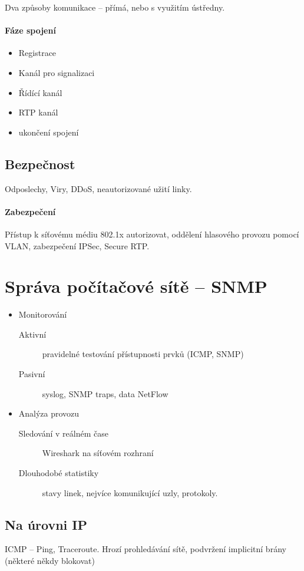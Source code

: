 \documentclass[a4wide]{report}
\begin{document}
Dva způsoby komunikace -- přímá, nebo s využitím ústředny.

\paragraph{Fáze spojení}
\begin{itemize}
	\item Registrace
	\item Kanál pro signalizaci
	\item Řídící kanál
	\item RTP kanál
	\item ukončení spojení
\end{itemize}

\subsection{Bezpečnost}

Odposlechy, Viry, DDoS, neautorizované užití linky.

\paragraph{Zabezpečení}
Přístup k síťovému médiu 802.1x autorizovat, oddělení hlasového provozu pomocí VLAN, zabezpečení IPSec, Secure RTP.

\section{Správa počítačové sítě -- SNMP}

\begin{itemize}
	\item Monitorování \hfill
	\begin{description}
		\item[Aktivní] pravidelné testování přístupnosti prvků (ICMP, SNMP)
		\item[Pasivní] syslog, SNMP traps, data NetFlow
	\end{description}
	\item Analýza provozu \hfill
	\begin{description}
		\item[Sledování v reálném čase] Wireshark na síťovém rozhraní
		\item[Dlouhodobé statistiky] stavy linek, nejvíce komunikující uzly, protokoly.
	\end{description}
\end{itemize}

\subsection{Na úrovni IP}
ICMP -- Ping, Traceroute. Hrozí prohledávání sítě, podvržení implicitní brány (některé někdy blokovat)
\end{document}
